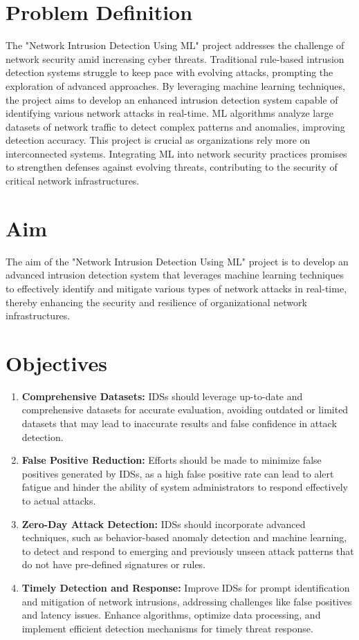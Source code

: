 \section{Problem Definition}
The "Network Intrusion Detection Using ML" project addresses the challenge of network
security amid increasing cyber threats. Traditional rule-based intrusion detection systems
struggle to keep pace with evolving attacks, prompting the exploration of advanced approaches.
By leveraging machine learning techniques, the project aims to develop an enhanced intrusion
detection system capable of identifying various network attacks in real-time. ML algorithms
analyze large datasets of network traffic to detect complex patterns and anomalies, improving
detection accuracy. This project is crucial as organizations rely more on interconnected
systems. Integrating ML into network security practices promises to strengthen defenses
against evolving threats, contributing to the security of critical network infrastructures.

\section{Aim}
The aim of the "Network Intrusion Detection Using ML" project is to develop an advanced
intrusion detection system that leverages machine learning techniques to effectively identify
and mitigate various types of network attacks in real-time, thereby enhancing the security and
resilience of organizational network infrastructures.

\section{Objectives}
\begin{enumerate}
    \item \textbf{Comprehensive Datasets:} IDSs should leverage up-to-date and comprehensive datasets for accurate evaluation, avoiding outdated or limited datasets that may lead to inaccurate results and false confidence in attack detection.
    \item \textbf{False Positive Reduction:} Efforts should be made to minimize false positives generated by IDSs, as a high false positive rate can lead to alert fatigue and hinder the ability of system administrators to respond effectively to actual attacks.
    \item \textbf{Zero-Day Attack Detection:} IDSs should incorporate advanced techniques, such as behavior-based anomaly detection and machine learning, to detect and respond to emerging and previously unseen attack patterns that do not have pre-defined signatures or rules.
    \item \textbf{Timely Detection and Response:} Improve IDSs for prompt identification and mitigation of network intrusions, addressing challenges like false positives and latency issues. Enhance algorithms, optimize data processing, and implement efficient detection mechanisms for timely threat response.
\end{enumerate}
